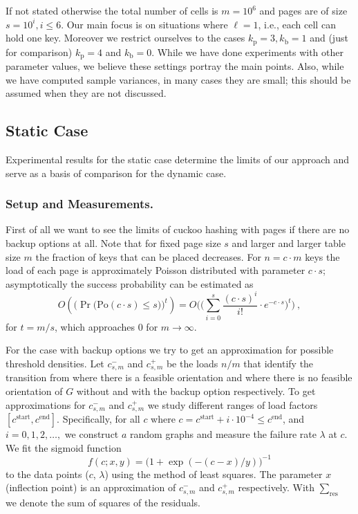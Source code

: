 \let\accentvec\vec \documentclass{llncs}
\newcommand{\fr}{\lambda}
\newcommand{\res}{\sum_{\mathrm{res}}}
\newcommand{\kprim}{{k_{\mathrm{p}}}}
\newcommand{\kback}{{k_{\mathrm{b}}}}
\newcommand{\tnb}{{c^{\scriptscriptstyle-}_{s,m}}}
\newcommand{\tb}{{c^{\scriptscriptstyle+}_{s,m}}}
\newcommand{\cs}{c^{\scriptstyle\mathrm{start}}}
\newcommand{\ce}{c^{\scriptstyle\mathrm{end}}}
\newcommand{\ie}{i.e.}
\begin{document}
If not stated otherwise the total number of cells is $m=10^6$ and pages are of size $s=10^i, i\leq 6$. Our main focus is on situations where $\ell=1$, \ie, each cell can hold one key. Moreover we restrict ourselves to the cases $\kprim=3, \kback=1$ and (just for comparison) $\kprim=4$ and $\kback=0$.  While we have done experiments with other parameter values, we believe these settings portray the main points.  Also, while we have computed sample variances, in many cases they are small;  this should be assumed when they are not discussed.  

\subsection{Static Case}
Experimental results for the static case determine the limits of our approach and serve as a basis of comparison for the dynamic case.
\subsubsection{Setup and Measurements.}
First of all we want to see the limits of cuckoo hashing with pages if there are no backup options at all.
Note that for fixed page size $s$ and larger and larger table size $m$ the fraction of keys that can be placed decreases.
For $n=c\cdot m$ keys the load of each page is approximately Poisson distributed with parameter $c\cdot s$; 
asymptotically the success probability
can be estimated as
\begin{equation}
O\left(\Big(\Pr\big(\mathrm{Po}(c\cdot s) \leq s \big)\Big)^t \right)
= O\bigg( \Big( \sum_{i=0}^s \frac{(c\cdot s)^i}{i!}\cdot e^{-c\cdot s}\Big)^t \bigg)\ , 
\end{equation}
for $t=m/s$, which approaches $0$ for $m\to \infty$.

For the case with backup options we try to get an approximation for possible threshold densities.
Let $\tnb$ and $\tb$ be the loads ${n}/{m}$ that identify the transition from where there is a feasible orientation and where there is no feasible orientation of $G$ without and with the backup option respectively.
To get approximations for $\tnb$ and $\tb$ we study different ranges of load factors $[\cs,\ce]$.
Specifically, for all $c$ where $c=\cs+i\cdot 10^{-4}\leq c^{\mathrm{end}}$, and  $i=0,1,2,\ldots,$ we construct $a$ random graphs 
and measure the failure rate $\fr$ at $c$. We fit the sigmoid function 
\begin{equation}
 \label{eq:sigmoid}
f(c;x,y) = \big(1+\exp( -(c-x)/y ) \big)^{-1} 
\end{equation}
to the data points ($c$, $\fr$) using the method of least squares. The parameter $x$ (inflection point) is an approximation of $\tnb$ and $\tb$ respectively. With $\res$ we denote the sum of squares of the residuals.
\end{document}
